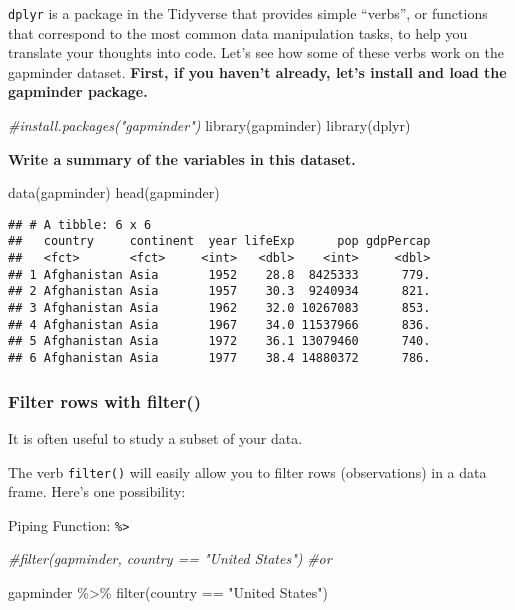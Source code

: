 \documentclass[
]{article}
\newenvironment{Shaded}{\begin{snugshade}}{\end{snugshade}}
\newcommand{\CommentTok}[1]{\textcolor[rgb]{0.56,0.35,0.01}{\textit{#1}}}
\newcommand{\FunctionTok}[1]{\textcolor[rgb]{0.00,0.00,0.00}{#1}}
\newcommand{\NormalTok}[1]{#1}
\newcommand{\SpecialCharTok}[1]{\textcolor[rgb]{0.00,0.00,0.00}{#1}}
\newcommand{\StringTok}[1]{\textcolor[rgb]{0.31,0.60,0.02}{#1}}
\begin{document}
\texttt{dplyr} is a package in the Tidyverse that provides simple
``verbs'', or functions that correspond to the most common data
manipulation tasks, to help you translate your thoughts into code. Let's
see how some of these verbs work on the gapminder dataset.
\textbf{First, if you haven't already, let's install and load the
gapminder package.}

\begin{Shaded}
\begin{Highlighting}[]
\CommentTok{\#install.packages("gapminder")}
\FunctionTok{library}\NormalTok{(gapminder)}
\FunctionTok{library}\NormalTok{(dplyr)}
\end{Highlighting}
\end{Shaded}

\textbf{Write a summary of the variables in this dataset. }

\begin{Shaded}
\begin{Highlighting}[]
\FunctionTok{data}\NormalTok{(gapminder)}
\FunctionTok{head}\NormalTok{(gapminder)}
\end{Highlighting}
\end{Shaded}

\begin{verbatim}
## # A tibble: 6 x 6
##   country     continent  year lifeExp      pop gdpPercap
##   <fct>       <fct>     <int>   <dbl>    <int>     <dbl>
## 1 Afghanistan Asia       1952    28.8  8425333      779.
## 2 Afghanistan Asia       1957    30.3  9240934      821.
## 3 Afghanistan Asia       1962    32.0 10267083      853.
## 4 Afghanistan Asia       1967    34.0 11537966      836.
## 5 Afghanistan Asia       1972    36.1 13079460      740.
## 6 Afghanistan Asia       1977    38.4 14880372      786.
\end{verbatim}

\hypertarget{filter-rows-with-filter}{%
\subsubsection{Filter rows with
filter()}\label{filter-rows-with-filter}}

It is often useful to study a subset of your data.

The verb \texttt{filter()} will easily allow you to filter rows
(observations) in a data frame. Here's one possibility:

Piping Function: \texttt{\%\textgreater{}}

\begin{Shaded}
\begin{Highlighting}[]
\CommentTok{\#filter(gapminder, country == "United States")}
\CommentTok{\#or}

\NormalTok{gapminder }\SpecialCharTok{\%\textgreater{}\%}
  \FunctionTok{filter}\NormalTok{(country }\SpecialCharTok{==} \StringTok{"United States"}\NormalTok{)}
\end{Highlighting}
\end{Shaded}
\end{document}
